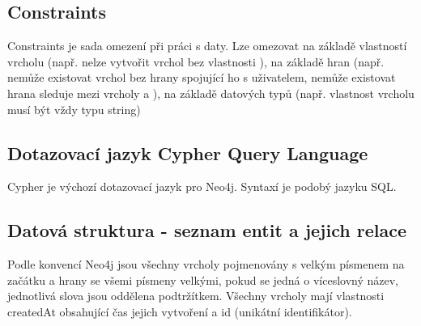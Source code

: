 \documentclass[12pt, a4paper,
 twoside,        %
 openright
]{report}
\begin{document}
    \subsection{Constraints}
        Constraints je sada omezení při práci s daty. Lze omezovat na základě vlastností vrcholu (např. nelze vytvořit vrchol  bez vlastnosti ), na základě hran (např. nemůže existovat vrchol  bez hrany  spojující ho s uživatelem, nemůže existovat hrana sleduje mezi vrcholy  a ), na základě datových typů (např. vlastnost  vrcholu  musí být vždy typu string)
    \subsection{Dotazovací jazyk Cypher Query Language}
        Cypher je výchozí dotazovací jazyk pro Neo4j. Syntaxí je podobý jazyku SQL. \cite{CypherQL}
        
    \subsection{Datová struktura - seznam entit a jejich relace}
        Podle konvencí Neo4j jsou všechny vrcholy pojmenovány s velkým písmenem na začátku a hrany se všemi písmeny velkými, pokud se jedná o víceslovný název, jednotlivá slova jsou oddělena podtržítkem. \cite{Neo4jNamingRules}
            Všechny vrcholy mají vlastnosti createdAt obsahující čas jejich vytvoření a id (unikátní identifikátor).
\end{document}
